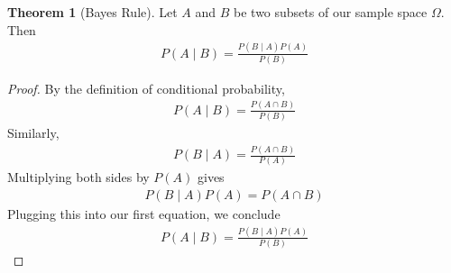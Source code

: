 \documentclass{tufte-book}
\theoremstyle{definition}
\newtheorem{theorem}{Theorem}
\numberwithin{theorem}{section}
\numberwithin{definition}{section}
\numberwithin{lemma}{section}
\numberwithin{corollary}{section}
\numberwithin{proposition}{section}
\numberwithin{remark}{section}
\numberwithin{claim}{section}
\numberwithin{observation}{section}
\numberwithin{fact}{section}
\numberwithin{assumption}{section}
\numberwithin{example}{section}
\numberwithin{exercise}{section}
\begin{document}
\begin{theorem}[Bayes Rule]
Let $A$ and $B$ be two subsets of our sample space $\Omega$. Then
\begin{align*}
P(A \mid B) = \frac{P(B \mid A) P(A)}{P(B)}
\end{align*}
\end{theorem}

\begin{proof}
By the definition of conditional probability,
\begin{align*}
P(A \mid B) = \frac{P(A \cap B)}{P(B)}
\end{align*}
Similarly,
\begin{align*}
P(B \mid A) = \frac{P(A \cap B)}{P(A)}
\end{align*}
Multiplying both sides by $P(A)$ gives
\begin{align*}
P(B \mid A)P(A) = P(A \cap B)
\end{align*}
Plugging this into our first equation, we conclude
\begin{align*}
P(A \mid B) = \frac{P(B \mid A) P(A)}{P(B)}
\end{align*}
\end{proof}
\end{document}
